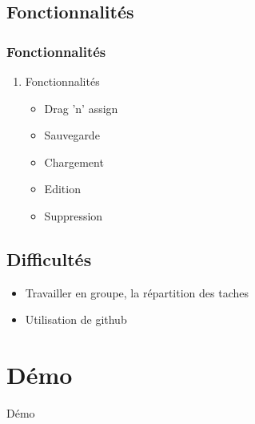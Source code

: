 \documentclass[12pt]{beamer}
\begin{document}
\subsection{Fonctionnalités}
    \begin{frame} 
    \frametitle{Fonctionnalités}
        \begin{enumerate}
            \item Fonctionnalités
            \begin{itemize}
                \item Drag 'n' assign
                \item Sauvegarde
                \item Chargement
                \item Edition
                \item Suppression
            \end{itemize}    
        \end{enumerate}
\end{frame}

\subsection{Difficultés}
    \begin{frame}
        \begin{itemize}
          \item Travailler en groupe, la répartition des taches
          \item Utilisation de github
        \end{itemize}
    \end{frame}

\section{Démo}
    \begin{frame}{Démo}
    \end{frame}
\end{document}

